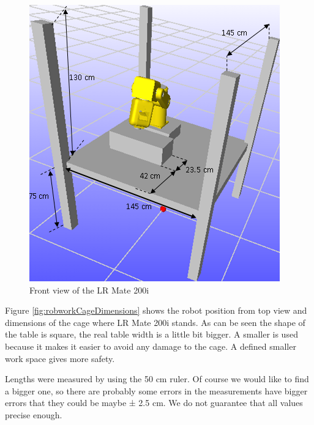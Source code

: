 \begin{figure}[H]
  \centering
  \includegraphics[scale= 0.7]{source/robworkCage.png}
  \caption{Front view of the LR Mate 200i}
  \label{fig:robworkCage}
\end{figure}

Figure \ref{fig:robworkCageDimensions} shows the robot position from top view and dimensions of the cage where LR Mate 200i stands. As can be seen the shape of the table is square, the real table width is a little bit bigger. A smaller is used because it makes it easier to avoid any damage to the cage. A defined smaller work space gives more safety.\newline

Lengths were measured by using the 50 cm ruler. Of course we would like to find a bigger one, so there are probably some errors in the measurements have bigger errors that they could be maybe ± 2.5 cm. We do not guarantee that all values precise enough.

